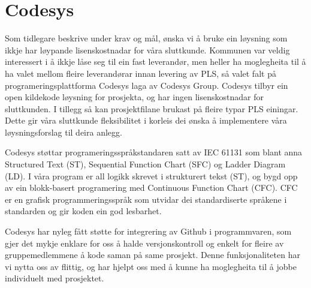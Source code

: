 \section{Codesys}
\thispagestyle{fancy}
Som tidlegare beskrive under krav og mål, ønska vi å bruke ein løysning som ikkje har løypande lisenskostnadar for våra sluttkunde. 
Kommunen var veldig interessert i å ikkje låse seg til ein fast leverandør, men heller ha moglegheita til å ha valet mellom fleire leverandørar innan levering av PLS, så valet falt på programeringsplattforma Codesys\citep{Codesys} laga av Codesys Group. 
Codesys tilbyr ein open kildekode løysning for prosjekta, og har ingen lisenskostnadar for sluttkunden. 
I tillegg så kan prosjektfilane brukast på fleire typar PLS einingar. 
Dette gir våra sluttkunde fleksibilitet i korleis dei ønska å implementere våra løysningsforslag til deira anlegg.

Codesys støttar programeringsspråkstandaren satt av IEC 61131 som blant anna Structured Text (ST), Sequential Function Chart (SFC) og Ladder Diagram (LD). I våra program er all logikk skrevet i strukturert tekst (ST), og bygd opp av ein blokk-basert programering med Continuous Function Chart (CFC). 
CFC er en grafisk programmeringsspråk som utvidar dei standardiserte språkene i standarden og gir koden ein god lesbarhet.

Codesys har nyleg fått støtte for integrering av Github i programmvaren, som gjer det mykje enklare for oss å halde versjonskontroll og enkelt for fleire av gruppemedlemmene å kode saman på same prosjekt. 
Denne funksjonaliteten har vi nytta oss av flittig, og har hjelpt oss med å kunne ha moglegheita til å jobbe individuelt med prosjektet. 
